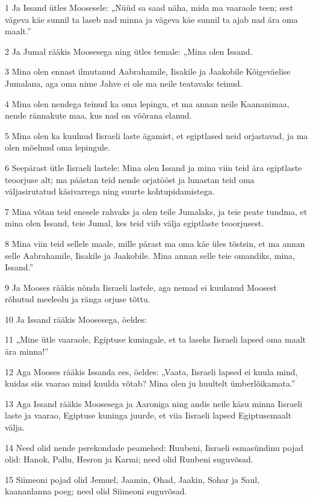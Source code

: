 \par 1 Ja Issand ütles Moosesele: „Nüüd sa saad näha, mida ma vaaraole teen; sest vägeva käe sunnil ta laseb nad minna ja vägeva käe sunnil ta ajab nad ära oma maalt.”
\par 2 Ja Jumal rääkis Moosesega ning ütles temale: „Mina olen Issand.
\par 3 Mina olen ennast ilmutanud Aabrahamile, Iisakile ja Jaakobile Kõigeväelise Jumalana, aga oma nime Jahve ei ole ma neile teatavaks teinud.
\par 4 Mina olen nendega teinud ka oma lepingu, et ma annan neile Kaananimaa, nende rännakute maa, kus nad on võõrana elanud.
\par 5 Mina olen ka kuulnud Iisraeli laste ägamist, et egiptlased neid orjastavad, ja ma olen mõelnud oma lepingule.
\par 6 Seepärast ütle Iisraeli lastele: Mina olen Issand ja mina viin teid ära egiptlaste teoorjuse alt; ma päästan teid nende orjatööst ja lunastan teid oma väljasirutatud käsivarrega ning suurte kohtupidamistega.
\par 7 Mina võtan teid enesele rahvaks ja olen teile Jumalaks, ja teie peate tundma, et mina olen Issand, teie Jumal, kes teid viib välja egiptlaste teoorjusest.
\par 8 Mina viin teid sellele maale, mille pärast ma oma käe üles tõstsin, et ma annan selle Aabrahamile, Iisakile ja Jaakobile. Mina annan selle teie omandiks, mina, Issand.”
\par 9 Ja Mooses rääkis nõnda Iisraeli lastele, aga nemad ei kuulanud Moosest rõhutud meeleolu ja ränga orjuse tõttu.
\par 10 Ja Issand rääkis Moosesega, öeldes:
\par 11 „Mine ütle vaaraole, Egiptuse kuningale, et ta laseks Iisraeli lapsed oma maalt ära minna!”
\par 12 Aga Mooses rääkis Issanda ees, öeldes: „Vaata, Iisraeli lapsed ei kuula mind, kuidas siis vaarao mind kuulda võtab? Mina olen ju huultelt ümberlõikamata.”
\par 13 Aga Issand rääkis Moosesega ja Aaroniga ning andis neile käsu minna Iisraeli laste ja vaarao, Egiptuse kuninga juurde, et viia Iisraeli lapsed Egiptusemaalt välja.
\par 14 Need olid nende perekondade peamehed: Ruubeni, Iisraeli esmasündinu pojad olid: Hanok, Pallu, Hesron ja Karmi; need olid Ruubeni suguvõsad.
\par 15 Siimeoni pojad olid Jemuel, Jaamin, Ohad, Jaakin, Sohar ja Saul, kaananlanna poeg; need olid Siimeoni suguvõsad.
